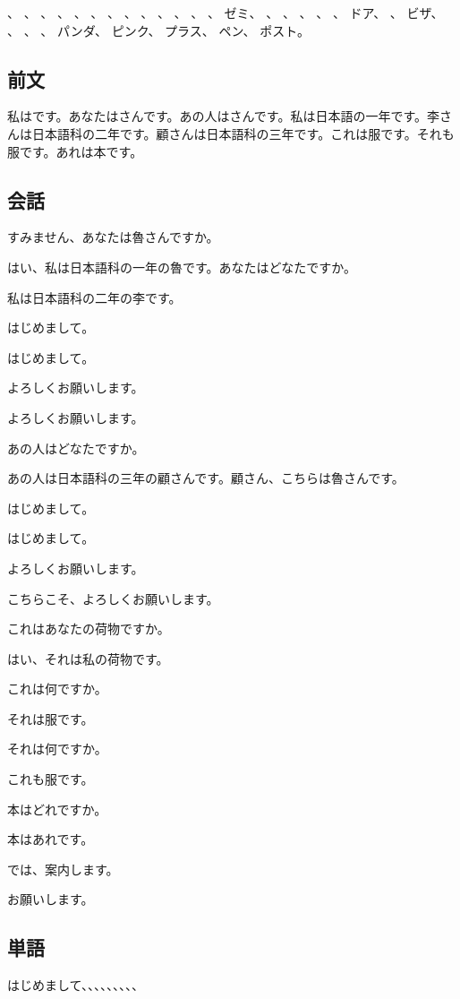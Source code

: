 \documentclass[a5j]{ltjtarticle}
\newcommand*{\Rospeaks}{\item[魯]}
\newcommand*{\Lispeaks}{\item[李]}
\newcommand*{\Kospeaks}{\item[顧]}
\begin{document}
\begin{onehalfspace}
  、
  、
  、
  、
  、
  、
  、
  、
  、
  、
  、
  、
  、
  ゼミ、
  、
  、
  、
  、
  、
  ドア、
  、
  ビザ、
  、
  、
  、
  パンダ、
  ピンク、
  プラス、
  ペン、
  ポスト。
\end{onehalfspace}

\subsection*{前文}

私はです。あなたはさんです。あの人はさんです。私は日本語の一年です。李さんは日本語科の二年です。顧さんは日本語科の三年です。これは服です。それも服です。あれは本です。

\subsection*{会話}

\begin{dialogue}
  \Lispeaks すみません、あなたは魯さんですか。
  \Rospeaks はい、私は日本語科の一年の魯です。あなたはどなたですか。
  \Lispeaks 私は日本語科の二年の李です。
  \Rospeaks はじめまして。
  \Lispeaks はじめまして。
  \Rospeaks よろしくお願いします。
  \Lispeaks よろしくお願いします。
  \Rospeaks あの人はどなたですか。
  \Lispeaks あの人は日本語科の三年の顧さんです。顧さん、こちらは魯さんです。
  \Kospeaks はじめまして。
  \Rospeaks はじめまして。
  \Kospeaks よろしくお願いします。
  \Rospeaks こちらこそ、よろしくお願いします。
  \Kospeaks これはあなたの荷物ですか。
  \Rospeaks はい、それは私の荷物です。
  \Kospeaks これは何ですか。
  \Rospeaks それは服です。
  \Kospeaks それは何ですか。
  \Rospeaks これも服です。
  \Kospeaks 本はどれですか。
  \Rospeaks 本はあれです。
  \Kospeaks では、案内します。
  \Rospeaks お願いします。
\end{dialogue}

\subsection*{単語}

はじめまして、、、、、、、、、
\end{document}
